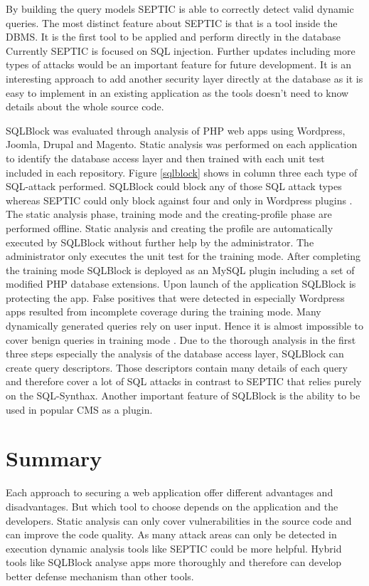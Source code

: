 By building the query models SEPTIC is able to correctly detect valid dynamic queries. The most distinct feature about SEPTIC is that is a tool inside the DBMS. It is the first tool to be applied and perform directly in the database \autocite[1182f, 1186]{Medeiros2019} Currently SEPTIC is focused on SQL injection. Further updates including more types of attacks would be an important feature for future development. It is an interesting approach to add another security layer directly at the database as it is easy to implement in an existing application as the tools doesn't need to know details about the whole source code.\newline


SQLBlock was evaluated through analysis of PHP web apps using Wordpress, Joomla, Drupal and Magento. Static analysis was performed on each application to identify the database access layer and then trained with each unit test included in each repository. Figure \ref{sqlblock} shows in column three each type of SQL-attack performed. SQLBlock could block any of those SQL attack types whereas SEPTIC could only block against four and only in Wordpress plugins \autocite[11]{Jahanshahi2018}. The static analysis phase, training mode and the creating-profile phase are performed offline. Static analysis and creating the profile are automatically executed by SQLBlock without further help by the administrator. The administrator only executes the unit test for the training mode. After completing the training mode SQLBlock is deployed as an MySQL plugin including a set of modified PHP database extensions. Upon launch of the application SQLBlock is protecting the app. False positives that were detected in especially Wordpress apps resulted from incomplete coverage during the training mode. Many dynamically generated queries rely on user input. Hence it is almost impossible to cover benign queries in training mode \autocite[10-12]{Jahanshahi2018}. Due to the thorough analysis in the first three steps especially the analysis of the database access layer, SQLBlock can create query descriptors. Those descriptors contain many details of each query and therefore cover a lot of SQL attacks in contrast to SEPTIC that relies purely on the SQL-Synthax. Another important feature of SQLBlock is the ability to be used in popular CMS as a plugin.


\section{Summary}
Each approach to securing a web application offer different advantages and disadvantages. But which tool to choose depends on the application and the developers. Static analysis can only cover vulnerabilities in the source code and can improve the code quality. As many attack areas can only be detected in execution dynamic analysis tools like SEPTIC could be more helpful. Hybrid tools like SQLBlock analyse apps more thoroughly and therefore can develop better defense mechanism than other tools. 

